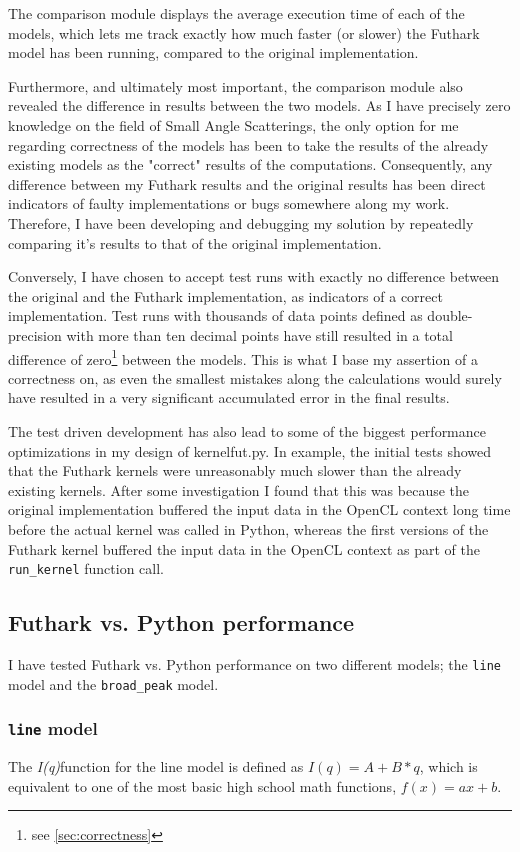 \documentclass[11pt]{article}
\newcommand{\iq}{\textit{I(q)}}
\begin{document}
The comparison module displays the average execution time of each of the models,
which lets me track exactly how much faster (or slower) the Futhark model has
been running, compared to the original implementation.

Furthermore, and ultimately most important, the comparison module also
revealed the difference in results between the two models. 
As I have precisely zero knowledge on the field of Small Angle Scatterings, 
the only option for me regarding correctness of the models has been to take
the results of the already existing models as the "correct" results of the
computations. Consequently, any difference between my Futhark results and the
original results has been direct indicators of faulty implementations or bugs
somewhere along my work.
Therefore, I have been developing and debugging my solution by repeatedly
comparing it's results to that of the original implementation.

Conversely, I have chosen to accept test runs with exactly no difference
between the original and the Futhark implementation, as indicators of a
correct implementation. 
Test runs with thousands of data points defined as double-precision
with more than ten decimal points have still resulted in a total difference of
zero\footnote{see \ref{sec:correctness}} between the models.
This is what I base my assertion of a correctness on, as even the smallest 
mistakes along the calculations would surely have resulted in a very significant
accumulated error in the final results.

The test driven development has also lead to some of the biggest performance
optimizations in my design of kernelfut.py.
In example, the initial tests showed that the Futhark kernels were unreasonably
much slower than the already existing kernels. After some investigation I found
that this was because the original implementation buffered the input data in the
OpenCL context long time before the actual kernel was called in Python, whereas
the first versions of the Futhark kernel buffered the input data in the OpenCL
context as part of the \texttt{run\_kernel} function call.

\subsection{Futhark vs. Python performance}
I have tested Futhark vs. Python performance on two different models; 
the \texttt{line} model and the \texttt{broad\_peak} model.

\subsubsection{\texttt{line} model}
The \iq function for the line model is defined as $I(q) = A + B*q$, which is
equivalent to one of the most basic high school math functions, $f(x) = ax + b$.
\end{document}
